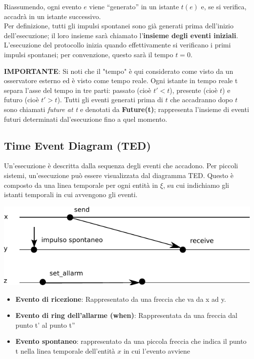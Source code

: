 Riassumendo, ogni evento $e$ viene “generato” in un istante $t(e)$ e, se si
verifica, accadrà in un istante successivo.\\
Per definizione, tutti gli impulsi spontanei sono già generati prima dell'inizio
dell'esecuzione; il loro insieme sarà chiamato l'\textbf{insieme degli eventi
    iniziali}. L'esecuzione del protocollo inizia quando effettivamente si
verificano i primi impulsi spontanei; per convenzione, questo sarà il tempo $t =
    0$.

\textbf{IMPORTANTE}: Si noti che il "tempo" è qui considerato come visto da un
osservatore esterno ed è visto come tempo reale. Ogni istante in tempo reale t
separa l'asse del tempo in tre parti: passato (cioè {$t' < t$}), presente (cioè
$t$) e futuro (cioè {$t' > t$}). Tutti gli eventi generati prima di $t$ che
accadranno dopo $t$ sono chiamati \textit{future at t} e denotati da
\textbf{Future(t)}; rappresenta l'insieme di eventi futuri determinati
dal'esecuzione fino a quel momento.

\subsection*{Time Event Diagram (TED)}
Un'esecuzione è descritta dalla sequenza degli eventi che accadono. Per piccoli
sistemi, un'esecuzione può essere visualizzata dal diagramma TED. Questo è
composto da una linea temporale per ogni entità in $\xi$, su cui indichiamo gli
istanti temporali in cui avvengono gli eventi.
\begin{center}
    \includegraphics[scale=0.8]{capitoli/introduzione_ambiente-distribuito/imgs/n_07}
\end{center}

\begin{itemize}
    \item \textbf{Evento di ricezione}: Rappresentato da una freccia che va da x
          ad y.
    \item \textbf{Evento di ring dell'allarme (when)}: Rappresentata da una
          freccia dal punto t' al punto t''
    \item \textbf{Evento spontaneo}: rappresentato da una piccola freccia che
          indica il punto t nella linea temporale dell'entità $x$ in cui l'evento
          avviene
\end{itemize}

